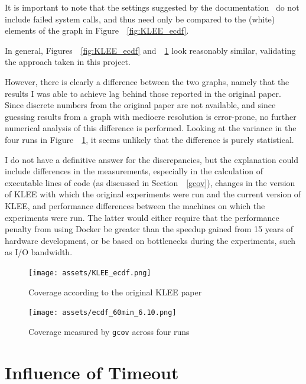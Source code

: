 \documentclass{article}
\let\savedCite=\cite
\renewcommand{\cite}{\unskip~\savedCite}
\let\savedRef=\ref
\renewcommand{\ref}{\unskip~\savedRef}
\begin{document}
It is important to note that the settings suggested by the documentation\cite{KLEEFAQ} do not include failed system calls, and thus need only be compared to the  (white) elements of the graph in Figure~\ref{fig:KLEE_ecdf}.

In general, Figures~\ref{fig:KLEE_ecdf} and~\ref{fig:ecdf_60min_6.10} look reasonably similar, validating the approach taken in this project.

However, there is clearly a difference between the two graphs, namely that the results I was able to achieve lag behind those reported in the original paper. Since discrete numbers from the original paper are not available, and since guessing results from a graph with mediocre resolution is error-prone, no further numerical analysis of this difference is performed. Looking at the variance in the four runs in Figure~\ref{fig:ecdf_60min_6.10}, it seems unlikely that the difference is purely statistical.

I do not have a definitive answer for the discrepancies, but the explanation could include differences in the measurements, especially in the calculation of executable lines of code (as discussed in Section~\ref{gcov}), changes in the version of KLEE with which the original experiments were run and the current version of KLEE, and performance differences between the machines on which the experiments were run. The latter would either require that the performance penalty from using Docker be greater than the speedup gained from 15 years of hardware development, or be based on bottlenecks during the experiments, such as I/O bandwidth.

\begin{figure}[htbp]
    \centering
    \begin{minipage}[b]{0.48\linewidth}
        \texttt{[image: assets/KLEE\_ecdf.png]}
        \captionsetup{width=0.7\linewidth, skip=24px}
        \caption{Coverage according to the original KLEE paper\cite{KLEE}}
        \label{fig:KLEE_ecdf}
    \end{minipage}
    \hfill
    \begin{minipage}[b]{0.48\linewidth}
        \texttt{[image: assets/ecdf\_60min\_6.10.png]}
        \captionsetup{width=0.75\linewidth}
        \caption{Coverage measured by \lstinline{gcov} across four runs}
        \label{fig:ecdf_60min_6.10}
    \end{minipage}
\end{figure}

\section{Influence of Timeout}
\label{Timeouts}
\end{document}
